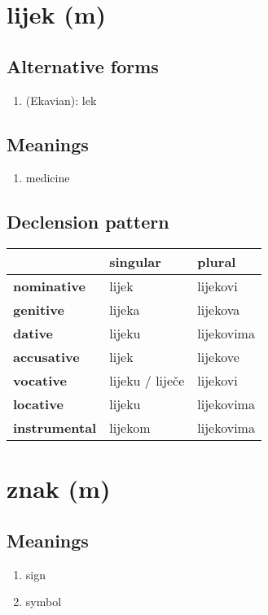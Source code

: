 \filbreak
\section{lijek (m)}
\subsection*{Alternative forms}
\begin{enumerate}
\item (Ekavian): lek
\end{enumerate}
\subsection*{Meanings}
\begin{enumerate}
\item medicine
\end{enumerate}
\subsection*{Declension pattern}
\begin{tabularx}{\linewidth}{Xll}
\toprule
{} &         singular &      plural \\
\midrule
\textbf{nominative  } &            lijek &    lijekovi \\
\textbf{genitive    } &           lijeka &    lijekova \\
\textbf{dative      } &           lijeku &  lijekovima \\
\textbf{accusative  } &            lijek &    lijekove \\
\textbf{vocative    } &  lijeku / liječe &    lijekovi \\
\textbf{locative    } &           lijeku &  lijekovima \\
\textbf{instrumental} &          lijekom &  lijekovima \\
\bottomrule
\end{tabularx}

\filbreak
\section{znak (m)}
\subsection*{Meanings}
\begin{enumerate}
\item sign
\item symbol
\end{enumerate}
